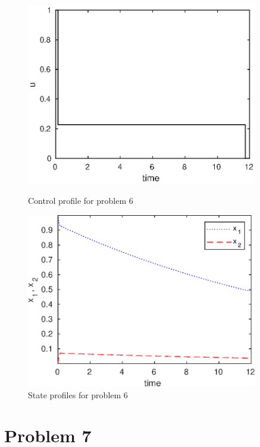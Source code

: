 \begin{figure}[htb]
\begin{minipage}[t]{0.5\linewidth}
\centering
\includegraphics[width=0.9\textwidth]{examples/problem6/graphs/u_5212a.eps}
\caption[Problem 6: Control profile]{Control profile for problem 6}
\label{fig:prob6_u} 
\end{minipage}
\begin{minipage}[t]{0.5\linewidth}
\centering
\includegraphics[width=0.9\textwidth]{examples/problem6/graphs/x12_5212a.eps}
\caption[Problem 6: State profiles]{State profiles for problem 6}
\label{fig:prob6_x}  
\end{minipage}
\end{figure}

\section{Problem 7}
\label{sec:prob7}

